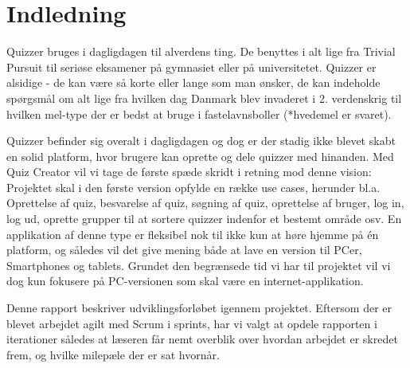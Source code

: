 \chapter{Indledning}
Quizzer bruges i dagligdagen til alverdens ting. De benyttes i alt lige fra Trivial Pursuit til seriøse eksamener på gymnasiet eller på universitetet. Quizzer er alsidige - de kan være så korte eller lange som man ønsker, de kan indeholde spørgsmål om alt lige fra hvilken dag Danmark blev invaderet i 2. verdenskrig til hvilken mel-type der er bedst at bruge i fastelavnsboller (*hvedemel er svaret).

Quizzer befinder sig overalt i dagligdagen og dog er der stadig ikke blevet skabt en solid platform, hvor brugere kan oprette og dele quizzer med hinanden. Med Quiz Creator vil vi tage de første spæde skridt i retning mod denne vision: Projektet skal i den første version opfylde en række use cases, herunder bl.a. Oprettelse af quiz, besvarelse af quiz, søgning af quiz, oprettelse af bruger, log in, log ud, oprette grupper til at sortere quizzer indenfor et bestemt område osv. En applikation af denne type er fleksibel nok til ikke kun at høre hjemme på én platform, og således vil det give mening både at lave en version til PCer, Smartphones og tablets. Grundet den begrænsede tid vi har til projektet vil vi dog kun fokusere på PC-versionen som skal være en internet-applikation. 

Denne rapport beskriver udviklingsforløbet igennem projektet. Eftersom der er blevet arbejdet agilt med Scrum i sprints, har vi valgt at opdele rapporten i iterationer således at læseren får nemt overblik over hvordan arbejdet er skredet frem, og hvilke milepæle der er sat hvornår.